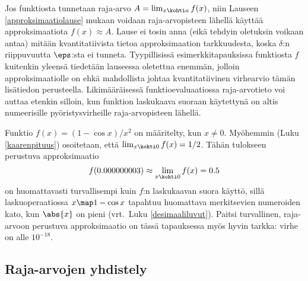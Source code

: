 Jos funktiosta tunnetaan raja-arvo $A = \lim_{x\kohti a} f(x)$, niin Lauseen 
\ref{approksimaatiolause} mukaan voidaan raja-arvopisteen lähellä käyttää approksimaatiota 
$f(x) \approx A$. Lause ei tosin anna (eikä tehdyin oletuksin voikaan antaa) mitään 
kvantitatiivista tietoa approksimaation tarkkuudesta, koska $\delta$:n riippuvuutta
$\eps$:sta ei tunneta. Tyypillisissä esimerkkitapauksissa funktiosta $f$ kuitenkin yleensä
tiedetään lauseessa oletettua enemmän, jolloin approksimaatiolle on ehkä mahdollista johtaa 
kvantitatiivinen virhearvio tämän lisätiedon perusteella. Likimääräisessä funktioevaluaatiossa
raja-arvotieto voi auttaa etenkin silloin, kun funktion laskukaava suoraan käytettynä on
altis numeerisille pyöristysvirheille raja-arvopisteen lähellä.
\begin{Exa} \label{raja-arvolla approksimointi} Funktio $f(x) = (1-\cos x)/x^2$ on määritelty,
kun $x \neq 0$. Myöhemmin (Luku \ref{kaarenpituus}) osoitetaan, että 
$\lim_{x \kohti 0} f(x) = 1/2$. Tähän tulokseen perustuva approksimaatio
\[
f(0.000000003) \approx \lim_{x \kohti 0} f(x) = 0.5
\]
on huomattavasti turvallisempi kuin $f$:n laskukaavan suora käyttö, sillä lasku\-operaatiossa
$x \map 1-\cos x$ tapahtuu huomattava merkitsevien numeroiden kato, kun $\abs{x}$ on pieni 
(vrt.\ Luku \ref{desimaaliluvut}). Paitsi turvallinen, raja-arvoon perustuva
\mbox{approksimaatio} on tässä tapauksessa myös hyvin tarkka: virhe on alle $10^{-18}$. \loppu
\end{Exa}

\subsection{Raja-arvojen yhdistely}

